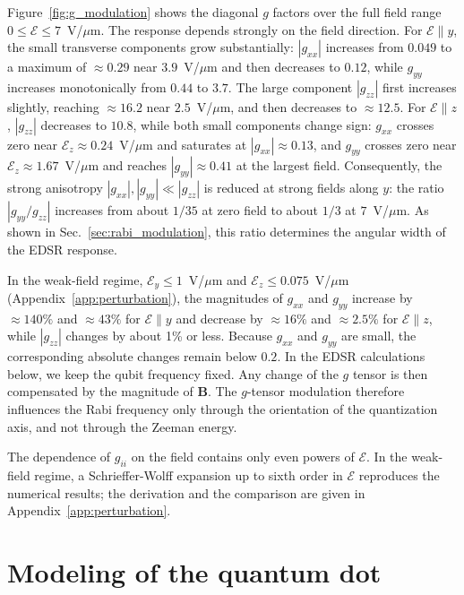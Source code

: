 \documentclass[
  aps,
  reprint,
  amsmath,
  amssymb,
  groupedaddress,
  floatfix,
  longbibliography,
]{revtex4-2}
\begin{document}
Figure~\ref{fig:g_modulation} shows the diagonal $g$ factors over the full field range $0\le\mathcal{E}\le7$~V/$\mu$m. The response depends strongly on the field direction. For $\mathcal{E}\parallel y$, the small transverse components grow substantially: $|g_{xx}|$ increases from $0.049$ to a maximum of $\approx0.29$ near $3.9$~V/$\mu$m and then decreases to $0.12$, while $g_{yy}$ increases monotonically from $0.44$ to $3.7$. The large component $|g_{zz}|$ first increases slightly, reaching $\approx16.2$ near $2.5$~V/$\mu$m, and then decreases to $\approx12.5$. For $\mathcal{E}\parallel z$, $|g_{zz}|$ decreases to $10.8$, while both small components change sign: $g_{xx}$ crosses zero near $\mathcal{E}_z\approx0.24$~V/$\mu$m and saturates at $|g_{xx}|\approx0.13$, and $g_{yy}$ crosses zero near $\mathcal{E}_z\approx1.67$~V/$\mu$m and reaches $|g_{yy}|\approx0.41$ at the largest field. Consequently, the strong anisotropy $|g_{xx}|,|g_{yy}|\ll|g_{zz}|$ is reduced at strong fields along $y$: the ratio $|g_{yy}/g_{zz}|$ increases from about $1/35$ at zero field to about $1/3$ at $7$~V/$\mu$m. As shown in Sec.~\ref{sec:rabi_modulation}, this ratio determines the angular width of the EDSR response.

In the weak-field regime, $\mathcal{E}_y\le1$~V/$\mu$m and $\mathcal{E}_z\le0.075$~V/$\mu$m (Appendix~\ref{app:perturbation}), the magnitudes of $g_{xx}$ and $g_{yy}$ increase by $\approx140\%$ and $\approx43\%$ for $\mathcal{E}\parallel y$ and decrease by $\approx16\%$ and $\approx2.5\%$ for $\mathcal{E}\parallel z$, while $|g_{zz}|$ changes by about 1\% or less. Because $g_{xx}$ and $g_{yy}$ are small, the corresponding absolute changes remain below $0.2$. In the EDSR calculations below, we keep the qubit frequency fixed. Any change of the $g$ tensor is then compensated by the magnitude of $\mathbf{B}$. The $g$-tensor modulation therefore influences the Rabi frequency only through the orientation of the quantization axis, and not through the Zeeman energy.

The dependence of $g_{ii}$ on the field contains only even powers of $\mathcal{E}$. In the weak-field regime, a Schrieffer-Wolff expansion up to sixth order in $\mathcal{E}$ reproduces the numerical results; the derivation and the comparison are given in Appendix~\ref{app:perturbation}.
\section{Modeling of the quantum dot}
\label{sec:model}
\end{document}

